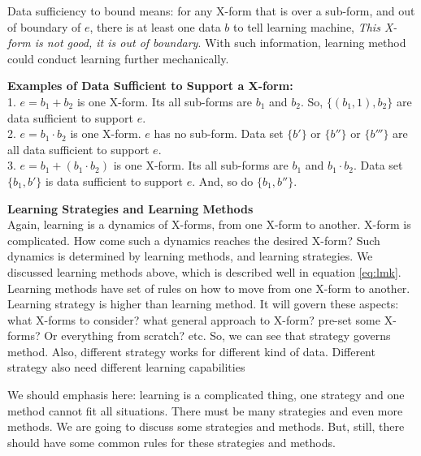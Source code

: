 Data sufficiency to bound means: for any X-form that is over a sub-form, and out of boundary of $e$, there is at least one data $b$ to tell learning machine, {\it This X-form is not good, it is out of boundary}. With such information, learning method could conduct learning further mechanically.  



{\bf Examples of Data Sufficient to Support a X-form: } \\
1. $e = b_1 + b_2$ is one X-form. Its all sub-forms are $b_1$ and $b_2$. So, $\{(b_1, 1), b_2\}$ are data sufficient to support $e$. \\
2. $e = b_1 \cdot b_2$ is one X-form. $e$ has no sub-form. Data set $\{b'\}$ or  $\{b''\}$ or $\{b'''\}$ are all data sufficient to support $e$. \\
3. $e = b_1 + (b_1 \cdot b_2)$ is one X-form. Its all sub-forms are $b_1$ and $b_1 \cdot b_2$. Data set $\{ b_1, b' \}$ is data sufficient to support $e$. And, so do  $\{ b_1, b'' \}$.  
\bigskip





{\bf Learning Strategies and Learning Methods } \\
Again, learning is a dynamics of X-forms, from one X-form to another. X-form is complicated. How come such a dynamics reaches the desired X-form? Such dynamics is determined by learning methods, and learning strategies. We discussed learning methods above, which is described well in equation  \eqref{eq:lmk}. Learning methods have set of rules on how to move from one X-form to another. Learning strategy is higher than learning method. It will govern these aspects: what X-forms to consider? what general approach to X-form? pre-set some X-forms? Or everything from scratch? etc. So, we can see that strategy governs method. Also, different strategy works for different kind of data. Different strategy also need different learning capabilities

We should emphasis here: learning is a complicated thing, one strategy and one method cannot fit all situations. There must be many strategies and even more methods. We are going to discuss some strategies and methods. But, still, there should have some common rules for these strategies and methods. 


